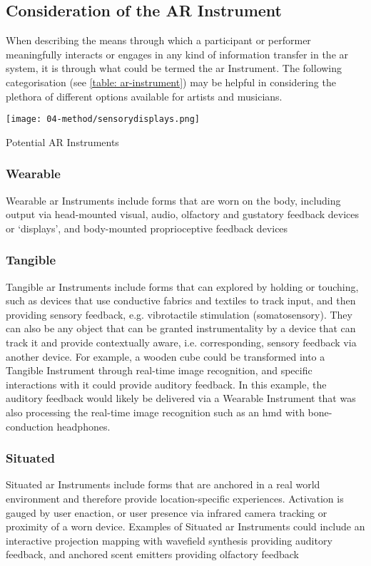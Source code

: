 \subsection{Consideration of the AR Instrument}\label{sec: discussion-guidelines-instrument}
When describing the means through which a participant or performer meaningfully interacts or engages in any kind of information transfer in the \gls{ar} system, it is through what could be termed the \gls{ar} Instrument. The following categorisation (see \autoref{table: ar-instrument}) may be helpful in considering the plethora of different options available for artists and musicians.
\begin{table}
    \centering
    {\texttt{[image: 04-method/sensorydisplays.png]}}
    \caption[Potential AR Instruments]{Potential AR Instruments}
\end{table}\label{table: ar-instrument}

\subsubsection{Wearable}
Wearable \gls{ar} Instruments include forms that are worn on the body, including output via head-mounted visual, audio, olfactory and gustatory feedback devices or `displays', and body-mounted proprioceptive feedback devices

\subsubsection{Tangible}
Tangible \gls{ar} Instruments include forms that can explored by holding or touching, such as devices that use conductive fabrics and textiles to track input, and then providing sensory feedback, e.g. vibrotactile stimulation (somatosensory). They can also be any object that can be granted instrumentality by a device that can track it and provide contextually aware, i.e. corresponding, sensory feedback via another device. For example, a wooden cube could be transformed into a Tangible Instrument through real-time image recognition, and specific interactions with it could provide auditory feedback. In this example, the auditory feedback would likely be delivered via a Wearable Instrument that was also processing the real-time image recognition such as an \gls{hmd} with bone-conduction headphones.

\subsubsection{Situated}
Situated \gls{ar} Instruments include forms that are anchored in a real world environment and therefore provide location-specific experiences. Activation is gauged by user enaction, or user presence via infrared camera tracking or proximity of a worn device. Examples of Situated \gls{ar} Instruments could include an interactive projection mapping with wavefield synthesis providing auditory feedback, and anchored scent emitters providing olfactory feedback


